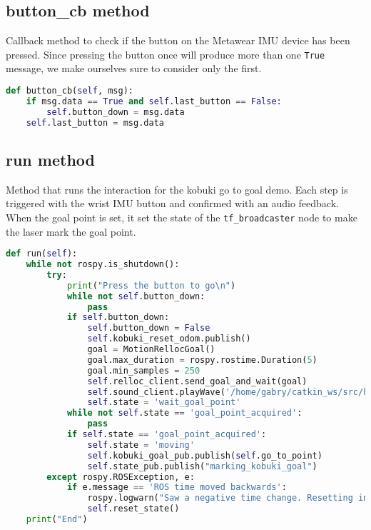 \subsection*{button\_cb method}
Callback method to check if the button on the Metawear IMU device has been pressed. Since pressing the button once will produce more than one \texttt{True} message, we make ourselves sure to consider only the first.
\begin{lstlisting}[caption={Button Callback},label={lst:buttoncb},language=Python]
def button_cb(self, msg):
    if msg.data == True and self.last_button == False:
        self.button_down = msg.data
    self.last_button = msg.data
\end{lstlisting}

\subsection*{run method}
Method that runs the interaction for the kobuki go to goal demo. Each step is triggered with the wrist IMU button and confirmed with an audio feedback. When the goal point is set, it set the state of the \texttt{tf\_broadcaster} node to make the laser mark the goal point.
\begin{lstlisting}[caption={Run Kobuki Go To Goal},label={lst:runkgtg},language=Python]
def run(self):
    while not rospy.is_shutdown():
        try:
            print("Press the button to go\n")
            while not self.button_down:
                pass
            if self.button_down:
                self.button_down = False
                self.kobuki_reset_odom.publish()
                goal = MotionRellocGoal()
                goal.max_duration = rospy.rostime.Duration(5) 
                goal.min_samples = 250
                self.relloc_client.send_goal_and_wait(goal)
                self.sound_client.playWave('/home/gabry/catkin_ws/src/hmri_pt_laser/nodes/sounds/beep.wav')
                self.state = 'wait_goal_point'
            while not self.state == 'goal_point_acquired':
                pass
            if self.state == 'goal_point_acquired':                     self.sound_client.playWave('/home/gabry/catkin_ws/src/    hmri_pt_laser/nodes/sounds/beep.wav')
                self.state = 'moving'
                self.kobuki_goal_pub.publish(self.go_to_point)
                self.state_pub.publish("marking_kobuki_goal")
        except rospy.ROSException, e:
            if e.message == 'ROS time moved backwards':
                rospy.logwarn("Saw a negative time change. Resetting internal state...")
                self.reset_state()
    print("End")
\end{lstlisting}
